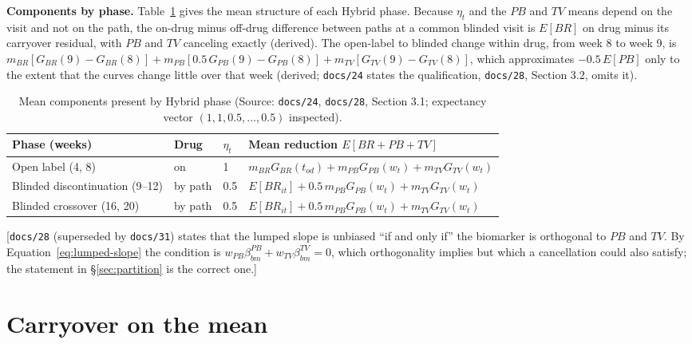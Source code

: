 \documentclass[11pt]{article}
\newcommand{\note}[1]{\textcolor{blue!60!black}{\small [#1]}}
\newcommand{\code}[1]{\texttt{#1}}
\begin{document}
\textbf{Components by phase.} Table~\ref{tab:invb-phases} gives the
mean structure of each Hybrid phase. Because $\eta_t$ and the
$PB$ and $TV$ means depend on the visit and not on the path, the
on-drug minus off-drug difference between paths at a common blinded
visit is $E[BR]$ on drug minus its carryover residual, with $PB$ and
$TV$ canceling exactly (derived). The open-label to blinded change
within drug, from week 8 to week 9, is
$m_{BR}[G_{BR}(9) - G_{BR}(8)] + m_{PB}[0.5\,G_{PB}(9) - G_{PB}(8)] +
m_{TV}[G_{TV}(9) - G_{TV}(8)]$, which approximates $-0.5\,E[PB]$ only
to the extent that the curves change little over that week (derived;
\code{docs/24} states the qualification, \code{docs/28}, Section 3.2,
omits it).

\begin{table}[h]
\centering\small
\caption{Mean components present by Hybrid phase (Source:
\code{docs/24}, \code{docs/28}, Section 3.1; expectancy vector
$(1, 1, 0.5, \ldots, 0.5)$ inspected).}
\label{tab:invb-phases}
\begin{tabular}{@{}llll@{}}
\toprule
Phase (weeks) & Drug & $\eta_t$ & Mean reduction $E[BR + PB + TV]$ \\
\midrule
Open label (4, 8) & on & 1 & $m_{BR}G_{BR}(t_{od}) + m_{PB}G_{PB}(w_t) +
  m_{TV}G_{TV}(w_t)$ \\
Blinded discontinuation (9--12) & by path & 0.5 & $E[BR_{it}] +
  0.5\,m_{PB}G_{PB}(w_t) + m_{TV}G_{TV}(w_t)$ \\
Blinded crossover (16, 20) & by path & 0.5 & $E[BR_{it}] +
  0.5\,m_{PB}G_{PB}(w_t) + m_{TV}G_{TV}(w_t)$ \\
\bottomrule
\end{tabular}
\end{table}

\note{\code{docs/28} (superseded by \code{docs/31}) states that the
lumped slope is unbiased ``if and only if'' the biomarker is
orthogonal to $PB$ and $TV$. By Equation~\eqref{eq:lumped-slope} the
condition is $w_{PB}\beta_{bm}^{PB} + w_{TV}\beta_{bm}^{TV} = 0$, which
orthogonality implies but which a cancellation could also satisfy;
the statement in \S\ref{sec:partition} is the correct one.}

\section{Carryover on the mean}
\label{sec:carryover-mean}
\end{document}
